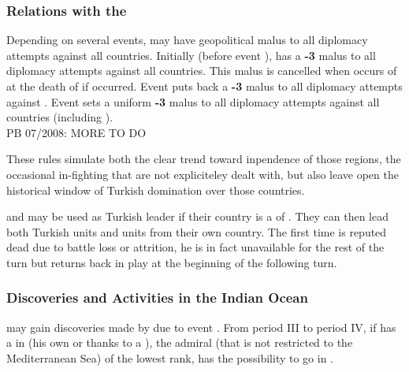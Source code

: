 \subsubsection{Relations with the }
\aparag Depending on several events, \TUR may have geopolitical malus to
all diplomacy attempts against all  countries.
\bparag Initially (before event ), \TUR has a {\bf -3} malus to all diplomacy attempts
against all  countries.
\bparag This malus is cancelled when  occurs of at the death of  if
 occurred.
\bparag Event  puts back a {\bf -3} malus to all
diplomacy attempts against .
\bparag Event  sets a uniform {\bf -3} malus
to all diplomacy attempts against all  countries
(including ).
\\
PB 07/2008: MORE TO DO
\begin{designnote}
These rules simulate both the clear trend toward inpendence of those regions,
the occasional in-fighting that are not expliciteley dealt with, but also leave
open the historical window of Turkish domination over those countries.
\end{designnote}

 and  may be used as Turkish leader if
their country is a \VASSAL of \TUR. They can then lead both Turkish
units and units from their own country.
 The first time  is
reputed dead due to battle loss or attrition, he is in fact unavailable
for the rest of the turn but returns back in play at the beginning of
the following turn.

\subsubsection{Discoveries and Activities in the Indian Ocean}
 \TUR may gain discoveries made
by  due to event .
From period III to period IV,  if \TUR has a \TP in   (his own or thanks
to a \dipAT), the admiral (that is not restricted to the Mediterranean Sea)
of the lowest rank, has the possibility to go in .

